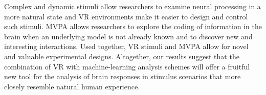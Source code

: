 \documentclass[authoryear]{elsarticle}
\begin{document}
Complex and dynamic stimuli allow researchers to examine neural processing in a more natural state and VR environments make it easier to design and control such stimuli.
MVPA allows researchers to explore the coding of information in the brain when an underlying model is not already known and to discover new and interesting interactions.
Used together, VR stimuli and MVPA allow for novel and valuable experimental designs.
Altogether, our results suggest that the combination of VR with machine-learning analysis schemes will offer a fruitful new tool for the analysis of brain responses in stimulus scenarios that more closely resemble natural human experience.


\end{document}
